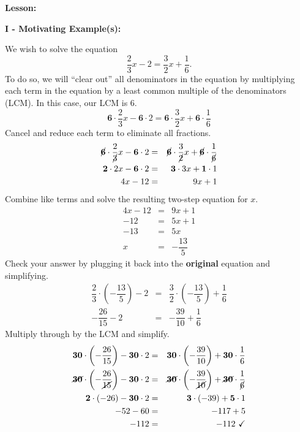 \documentclass[12pt]{article}
\theoremstyle{definition}
\begin{document}
{\bf Lesson:}
\par
{\bf I - Motivating Example(s):}\\
\par
We wish to solve the equation $$\dfrac{2}{3}x-2=\dfrac{3}{2}x+\dfrac{1}{6}.$$
To do so, we will ``clear out'' all denominators in the equation by multiplying each term in the equation by a least common multiple of the denominators (LCM).  In this case, our LCM is 6.
$$\textbf{6}\cdot \dfrac{2}{3}x-\textbf{6}\cdot 2=\textbf{6}\cdot \dfrac{3}{2}x+\textbf{6}\cdot \dfrac{1}{6}$$
Cancel and reduce each term to eliminate all fractions.
\begin{eqnarray*}
\cancel{\textbf{6}}\cdot \dfrac{2}{\cancel{3}}x-\textbf{6}\cdot 2&=&\cancel{\textbf{6}}\cdot \dfrac{3}{\cancel{2}}x+\cancel{\textbf{6}}\cdot \dfrac{1}{\cancel{6}}\\
\textbf{2}\cdot 2x-\textbf{6}\cdot 2&=&\textbf{3}\cdot 3x+\textbf{1}\cdot 1\\
4x-12&=&9x+1
\end{eqnarray*}
Combine like terms and solve the resulting two-step equation for $x$.
\begin{eqnarray*}
4x-12&=&9x+1\\
-12&=&5x+1\\
-13&=&5x\\
x&=&-\dfrac{13}{5}
\end{eqnarray*}
Check your answer by plugging it back into the {\bf original} equation and simplifying.
\begin{eqnarray*}
\dfrac{2}{3}\cdot\left(-\dfrac{13}{5}\right)-2&=&\dfrac{3}{2}\cdot\left(-\dfrac{13}{5}\right)+\dfrac{1}{6}\\
-\dfrac{26}{15}-2&=&-\dfrac{39}{10}+\dfrac{1}{6}
\end{eqnarray*}
Multiply through by the LCM and simplify.
\begin{eqnarray*}
\textbf{30}\cdot \left(-\dfrac{26}{15}\right)-\textbf{30}\cdot 2&=&\textbf{30}\cdot \left(-\dfrac{39}{10}\right)+\textbf{30}\cdot \dfrac{1}{6}\\
\cancel{\textbf{30}}\cdot \left(-\dfrac{26}{\cancel{15}}\right)-\textbf{30}\cdot 2&=&\cancel{\textbf{30}}\cdot \left(-\dfrac{39}{\cancel{10}}\right)+\cancel{\textbf{30}}\cdot \dfrac{1}{\cancel{6}}\\
\textbf{2}\cdot \left(-26\right)-\textbf{30}\cdot 2&=&\textbf{3}\cdot \left(-39\right)+\textbf{5}\cdot 1\\
-52-60&=&-117+5\\
-112&=&-112 \ \checkmark
\end{eqnarray*}
\end{document}
